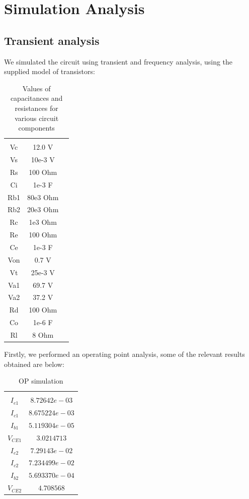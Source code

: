 \section{Simulation Analysis}
\label{sec:simulation}

\subsection{Transient analysis}

We simulated the circuit using transient and frequency analysis, using the supplied model of transistors:

\begin{table}[H]
\addtolength{\tabcolsep}{-4pt}
\caption{Values of capacitances and resistances for various circuit components}
\vspace{-3mm}
\begin{tabular}{|c|c|c|}
\hline\\
Vc & 12.0 V\\
Vs & 10e-3 V\\
Rs & 100 Ohm\\
Ci & 1e-3 F\\
Rb1& 80e3 Ohm\\
Rb2 &20e3 Ohm\\
Rc & 1e3 Ohm\\
Re &100 Ohm\\
Ce & 1e-3 F\\
Von&0.7 V\\
Vt&25e-3 V\\
Va1&69.7 V\\
Va2&37.2 V\\
Rd & 100 Ohm\\
Co & 1e-6 F\\
Rl & 8 Ohm\\
\hline
\end{tabular}
\label{tab:Components}
\end{table}

\par

Firstly, we performed an operating point analysis, some of the relevant results obtained are below:

\begin{table}[H]
    \addtolength{\tabcolsep}{-4pt}
    \caption{OP simulation}
    \vspace{-3mm}
    \begin{tabular}{|c|c|}
    \hline\\
    $I_{e1}$ & $8.72642e-03$\\
    $I_{c1}$ & $8.675224e-03$\\
    $I_{b1}$ & $5.119304e-05$\\  
    $V_{CE1}$ & $3.0214713$\\
    $I_{e2}$ & $7.29143e-02$\\
    $I_{c2}$ & $7.234499e-02$\\
    $I_{b2}$ & $5.693370e-04$\\  
    $V_{CE2}$ & $4.708568$\\
    \hline
    \end{tabular}
    \label{tab:OP_sim}
\end{table}

